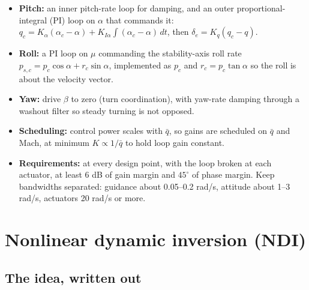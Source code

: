 \documentclass[11pt]{report}
\numberwithin{equation}{chapter}
\begin{document}
\begin{itemize}
\item \textbf{Pitch:} an inner pitch-rate loop for damping, and an outer proportional-integral
  (PI) loop on $\alpha$ that commands it:
  $q_c = K_\alpha(\alpha_c - \alpha) + K_{I\alpha}\int(\alpha_c - \alpha)\,dt$, then
  $\delta_e = K_q(q_c - q)$.
\item \textbf{Roll:} a PI loop on $\mu$ commanding the stability-axis roll rate
  $p_{s,c} = p_c\cos\alpha + r_c\sin\alpha$, implemented as $p_c$ and $r_c = p_c\tan\alpha$ so
  the roll is about the velocity vector.
\item \textbf{Yaw:} drive $\beta$ to zero (turn coordination), with yaw-rate damping through a
  washout filter so steady turning is not opposed.
\item \textbf{Scheduling:} control power scales with $\bar q$, so gains are scheduled on
  $\bar q$ and Mach, at minimum $K \propto 1/\bar q$ to hold loop gain constant.
\item \textbf{Requirements:} at every design point, with the loop broken at each actuator,
  at least 6 dB of gain margin and $45^\circ$ of phase margin. Keep bandwidths separated:
  guidance about 0.05--0.2 rad/s, attitude about 1--3 rad/s, actuators 20 rad/s or more.
\end{itemize}

\section{Nonlinear dynamic inversion (NDI)}

\subsection{The idea, written out}
\end{document}
